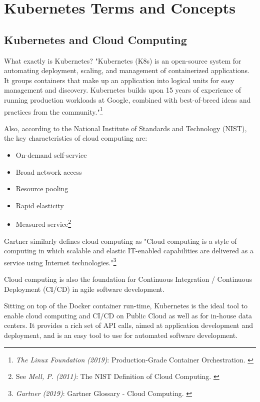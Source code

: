 %
%

\pagebreak
\section{Kubernetes Terms and Concepts}

\onehalfspacing

\subsection{Kubernetes and Cloud Computing}

What exactly is Kubernetes? "Kubernetes (K8s) is an open-source system for automating deployment, scaling, and management of containerized applications.
It groups containers that make up an application into logical units for easy management and discovery. Kubernetes builds upon 15 years of experience of running production workloads at Google, combined with best-of-breed ideas and practices from the community."\footnote{\textit{The Linux Foundation (2019)}: Production-Grade Container Orchestration. \cite{kubernetes}}

Also, according to the National Institute of Standards and Technology (NIST), the key characteristics of cloud computing are: 
\begin{itemize}
\item On-demand self-service
\item Broad network access
\item Resource pooling
\item Rapid elasticity
\item Measured service\footnote{See \textit{Mell, P. (2011)}: The NIST Definition of Cloud Computing. \cite{sp800-145}}
\end{itemize}

Gartner similarly defines cloud computing as "Cloud computing is a style of computing in which scalable and elastic IT-enabled capabilities are delivered as a service using Internet technologies."\footnote{\textit{Gartner (2019)}: Gartner Glossary - Cloud Computing. \cite{gartnerGlossary}}

Cloud computing is also the foundation for Continuous Integration / Continuous Deployment (CI/CD) in agile software development.

Sitting on top of the Docker container run-time, Kubernetes is the ideal tool to enable cloud computing and CI/CD on Public Cloud as well as for in-house data centers. It provides a rich set of API calls, aimed at application development and deployment, and is an easy tool to use for automated software development.


